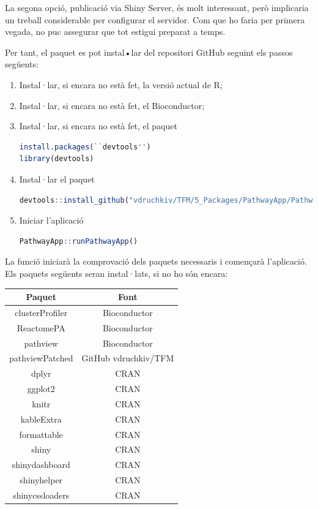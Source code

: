 \documentclass[]{article}
\begin{document}
La segona opció, publicació via Shiny Server, és molt interessant, però implicaria un treball considerable per configurar el servidor. Com que ho faria per primera vegada, no puc assegurar que tot estigui preparat a temps. 

Per tant, el paquet  es pot instal•lar del repositori GitHub seguint els passos següents:

\begin{enumerate}
\item Instal·lar, si encara no està fet, la versió actual de R;

\item Instal·lar, si encara no està fet, el Bioconductor;

\item Instal·lar, si encara no està fet, el paquet 

\begin{lstlisting}[language=R]
install.packages(``devtools'')
library(devtools)
\end{lstlisting}

\item Instal·lar el paquet 

\begin{lstlisting}[language=R]
devtools::install_github("vdruchkiv/TFM/5_Packages/PathwayApp/PathwayApp")
\end{lstlisting}

\item Iniciar l'aplicació 
\begin{lstlisting}[language=R]
PathwayApp::runPathwayApp()
\end{lstlisting}
\end{enumerate}

La funció  iniciarà la comprovació dels paquets necessaris i començarà l'aplicació. Els paquets següents seran instal·lats, si no ho són encara:

\begin{center}
\begin{tabular}{||c | c ||} 
\hline\hline 
\textbf{Paquet} & \textbf{Font} \\ [0.5ex] 
\hline\hline
clusterProfiler & Bioconductor \\
\hline
ReactomePA & Bioconductor \\
\hline
pathview & Bioconductor \\ 
\hline
pathviewPatched & GitHub vdruchkiv/TFM\\
\hline
dplyr & CRAN \\
\hline 
ggplot2 & CRAN \\
\hline
knitr & CRAN \\
\hline
kableExtra & CRAN \\
\hline
formattable & CRAN \\
\hline
shiny & CRAN \\
\hline 
shinydashboard & CRAN \\ 
\hline
shinyhelper & CRAN \\
\hline 
shinycssloaders & CRAN\\
\hline\hline
\end{tabular}
\end{center}
\end{document}
